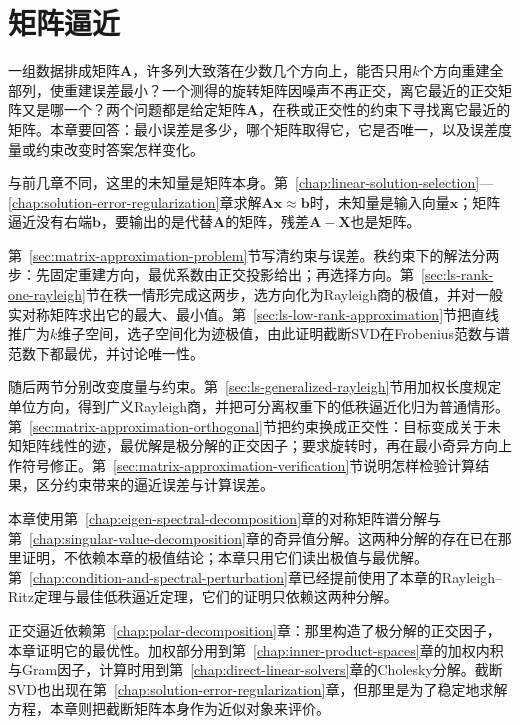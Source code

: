 \chapter{矩阵逼近}
\label{chap:matrix-approximation}

一组数据排成矩阵$\bm A$，许多列大致落在少数几个方向上，能否只用$k$个方向重建全部列，使重建误差最小？一个测得的旋转矩阵因噪声不再正交，离它最近的正交矩阵又是哪一个？两个问题都是给定矩阵$\bm A$，在秩或正交性的约束下寻找离它最近的矩阵。本章要回答：最小误差是多少，哪个矩阵取得它，它是否唯一，以及误差度量或约束改变时答案怎样变化。

与前几章不同，这里的未知量是矩阵本身。第~\ref{chap:linear-solution-selection}—\ref{chap:solution-error-regularization}章求解$\bm A\bm x\approx\bm b$时，未知量是输入向量$\bm x$；矩阵逼近没有右端$\bm b$，要输出的是代替$\bm A$的矩阵，残差$\bm A-\bm X$也是矩阵。

第~\ref{sec:matrix-approximation-problem}节写清约束与误差。秩约束下的解法分两步：先固定重建方向，最优系数由正交投影给出；再选择方向。第~\ref{sec:ls-rank-one-rayleigh}节在秩一情形完成这两步，选方向化为Rayleigh商的极值，并对一般实对称矩阵求出它的最大、最小值。第~\ref{sec:ls-low-rank-approximation}节把直线推广为$k$维子空间，选子空间化为迹极值，由此证明截断SVD在Frobenius范数与谱范数下都最优，并讨论唯一性。

随后两节分别改变度量与约束。第~\ref{sec:ls-generalized-rayleigh}节用加权长度规定单位方向，得到广义Rayleigh商，并把可分离权重下的低秩逼近化归为普通情形。第~\ref{sec:matrix-approximation-orthogonal}节把约束换成正交性：目标变成关于未知矩阵线性的迹，最优解是极分解的正交因子；要求旋转时，再在最小奇异方向上作符号修正。第~\ref{sec:matrix-approximation-verification}节说明怎样检验计算结果，区分约束带来的逼近误差与计算误差。

本章使用第~\ref{chap:eigen-spectral-decomposition}章的对称矩阵谱分解与第~\ref{chap:singular-value-decomposition}章的奇异值分解。这两种分解的存在已在那里证明，不依赖本章的极值结论；本章只用它们读出极值与最优解。第~\ref{chap:condition-and-spectral-perturbation}章已经提前使用了本章的Rayleigh--Ritz定理与最佳低秩逼近定理，它们的证明只依赖这两种分解。

正交逼近依赖第~\ref{chap:polar-decomposition}章：那里构造了极分解的正交因子，本章证明它的最优性。加权部分用到第~\ref{chap:inner-product-spaces}章的加权内积与Gram因子，计算时用到第~\ref{chap:direct-linear-solvers}章的Cholesky分解。截断SVD也出现在第~\ref{chap:solution-error-regularization}章，但那里是为了稳定地求解方程，本章则把截断矩阵本身作为近似对象来评价。

